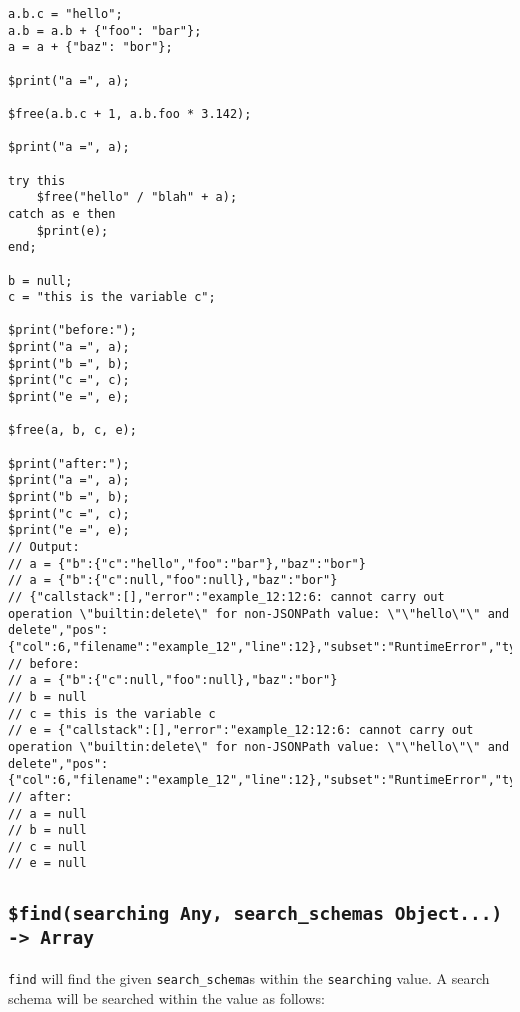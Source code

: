 \begin{verbatim}
a.b.c = "hello";
a.b = a.b + {"foo": "bar"};
a = a + {"baz": "bor"};

$print("a =", a);

$free(a.b.c + 1, a.b.foo * 3.142);

$print("a =", a);

try this
    $free("hello" / "blah" + a);
catch as e then
    $print(e);
end;

b = null;
c = "this is the variable c";

$print("before:");
$print("a =", a);
$print("b =", b);
$print("c =", c);
$print("e =", e);

$free(a, b, c, e);

$print("after:");
$print("a =", a);
$print("b =", b);
$print("c =", c);
$print("e =", e);
// Output:
// a = {"b":{"c":"hello","foo":"bar"},"baz":"bor"}
// a = {"b":{"c":null,"foo":null},"baz":"bor"}
// {"callstack":[],"error":"example_12:12:6: cannot carry out operation \"builtin:delete\" for non-JSONPath value: \"\"hello\"\" and delete","pos":{"col":6,"filename":"example_12","line":12},"subset":"RuntimeError","type":"InvalidOperation"}
// before:
// a = {"b":{"c":null,"foo":null},"baz":"bor"}
// b = null
// c = this is the variable c
// e = {"callstack":[],"error":"example_12:12:6: cannot carry out operation \"builtin:delete\" for non-JSONPath value: \"\"hello\"\" and delete","pos":{"col":6,"filename":"example_12","line":12},"subset":"RuntimeError","type":"InvalidOperation"}
// after:
// a = null
// b = null
// c = null
// e = null
\end{verbatim}

\cprotect\subsection{\verb|$find(searching Any, search_schemas Object...) -> Array|}
\label{sec:builtin-find}

\verb|find| will find the given \verb|search_schema|s within the \verb|searching| value. A search schema will be searched within the value as follows:

